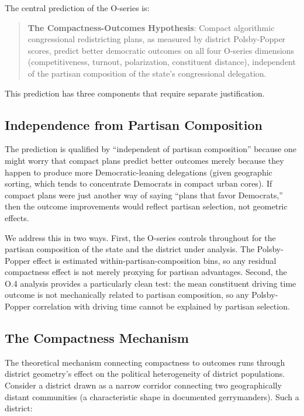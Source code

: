 \label{sec:prediction}

The central prediction of the O-series is:

\begin{quote}
\textbf{The Compactness-Outcomes Hypothesis}: Compact algorithmic congressional redistricting
plans, as measured by district Polsby-Popper scores, predict better democratic outcomes
on all four O-series dimensions (competitiveness, turnout, polarization, constituent
distance), independent of the partisan composition of the state's congressional delegation.
\end{quote}

This prediction has three components that require separate justification.

\subsection{Independence from Partisan Composition}

The prediction is qualified by ``independent of partisan composition'' because one
might worry that compact plans predict better outcomes merely because they happen
to produce more Democratic-leaning delegations (given geographic sorting, which tends
to concentrate Democrats in compact urban cores). If compact plans were just
another way of saying ``plans that favor Democrats,'' then the outcome improvements
would reflect partisan selection, not geometric effects.

We address this in two ways. First, the O-series controls throughout for the partisan
composition of the state and the district under analysis. The Polsby-Popper effect is
estimated within-partisan-composition bins, so any residual compactness effect is
not merely proxying for partisan advantages. Second, the O.4 analysis provides a
particularly clean test: the mean constituent driving time outcome is not mechanically
related to partisan composition, so any Polsby-Popper correlation with driving time
cannot be explained by partisan selection.

\subsection{The Compactness Mechanism}

The theoretical mechanism connecting compactness to outcomes runs through district
geometry's effect on the political heterogeneity of district populations. Consider
a district drawn as a narrow corridor connecting two geographically distant communities
(a characteristic shape in documented gerrymanders). Such a district:

